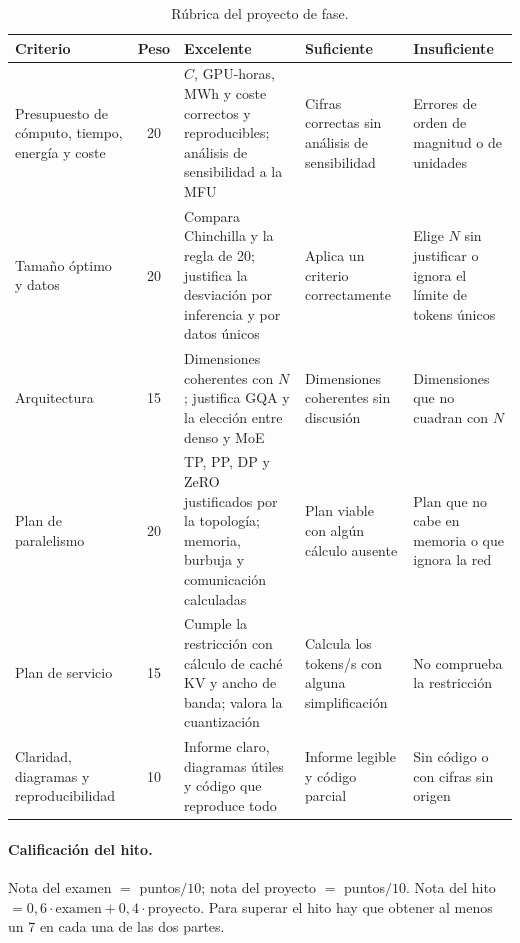 \begin{table}[h]
\centering\footnotesize
\caption{Rúbrica del proyecto de fase.}\label{tab:rubrica}
\begin{tabularx}{\textwidth}{@{}>{\raggedright\arraybackslash}p{2.5cm}c>{\raggedright\arraybackslash}X>{\raggedright\arraybackslash}X>{\raggedright\arraybackslash}X@{}}
\toprule
Criterio & Peso & Excelente & Suficiente & Insuficiente \\
\midrule
Presupuesto de cómputo, tiempo, energía y coste & 20 & $C$, GPU-horas, MWh y coste correctos y reproducibles; análisis de sensibilidad a la MFU & Cifras correctas sin análisis de sensibilidad & Errores de orden de magnitud o de unidades \\
\addlinespace
Tamaño óptimo y datos & 20 & Compara Chinchilla y la regla de 20; justifica la desviación por inferencia y por datos únicos & Aplica un criterio correctamente & Elige $N$ sin justificar o ignora el límite de tokens únicos \\
\addlinespace
Arquitectura & 15 & Dimensiones coherentes con $N$; justifica GQA y la elección entre denso y MoE & Dimensiones coherentes sin discusión & Dimensiones que no cuadran con $N$ \\
\addlinespace
Plan de paralelismo & 20 & TP, PP, DP y ZeRO justificados por la topología; memoria, burbuja y comunicación calculadas & Plan viable con algún cálculo ausente & Plan que no cabe en memoria o que ignora la red \\
\addlinespace
Plan de servicio & 15 & Cumple la restricción con cálculo de caché KV y ancho de banda; valora la cuantización & Calcula los tokens/s con alguna simplificación & No comprueba la restricción \\
\addlinespace
Claridad, diagramas y reproducibilidad & 10 & Informe claro, diagramas útiles y código que reproduce todo & Informe legible y código parcial & Sin código o con cifras sin origen \\
\bottomrule
\end{tabularx}
\end{table}

\paragraph{Calificación del hito.} Nota del examen $=$ puntos$/10$; nota del proyecto $=$ puntos$/10$. Nota del hito $=0{,}6\cdot\text{examen}+0{,}4\cdot\text{proyecto}$. Para superar el hito hay que obtener al menos un 7 en cada una de las dos partes.
